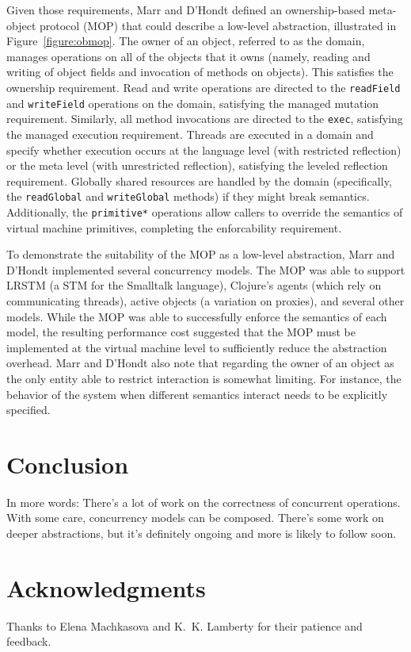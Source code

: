 \documentclass{sig-alternate}
\newcommand{\code}[1]{\texttt{#1}}
\begin{document}
Given those requirements, Marr and D'Hondt defined an ownership-based meta-object protocol (MOP) that could describe a low-level abstraction, illustrated in Figure~\ref{figure:obmop}. The owner of an object, referred to as the domain, manages operations on all of the objects that it owns (namely, reading and writing of object fields and invocation of methods on objects). This satisfies the ownership requirement. Read and write operations are directed to the \code{readField} and \code{writeField} operations on the domain, satisfying the managed mutation requirement. Similarly, all method invocations are directed to the \code{exec}, satisfying the managed execution requirement. Threads are executed in a domain and specify whether execution occurs at the language level (with restricted reflection) or the meta level (with unrestricted reflection), satisfying the leveled reflection requirement. Globally shared resources are handled by the domain (specifically, the \code{readGlobal} and \code{writeGlobal} methods) if they might break semantics. Additionally, the \code{primitive*} operations allow callers to override the semantics of virtual machine primitives, completing the enforcability requirement.

To demonstrate the suitability of the MOP as a low-level abstraction, Marr and D'Hondt implemented several concurrency models. The MOP was able to support LRSTM (a STM for the Smalltalk language), Clojure's agents (which rely on communicating threads), active objects (a variation on proxies), and several other models. While the MOP was able to successfully enforce the semantics of each model, the resulting performance cost suggested that the MOP must be implemented at the virtual machine level to sufficiently reduce the abstraction overhead. Marr and D'Hondt also note that regarding the owner of an object as the only entity able to restrict interaction is somewhat limiting. For instance, the behavior of the system when different semantics interact needs to be explicitly specified.

\section{Conclusion}

In more words: There's a lot of work on the correctness of concurrent operations. With some care, concurrency models can be composed. There's some work on deeper abstractions, but it's definitely ongoing and more is likely to follow soon.

\section*{Acknowledgments}

Thanks to Elena Machkasova and K.~K. Lamberty for their patience and feedback.

\printbibliography{}
\end{document}
